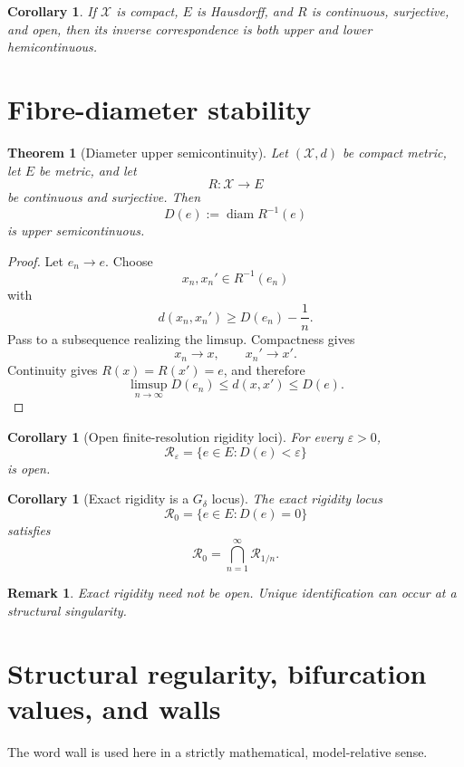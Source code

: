 \documentclass[11pt]{article}
\newtheorem{theorem}[definition]{Theorem}
\newtheorem{corollary}[definition]{Corollary}
\newtheorem{remark}[definition]{Remark}
\newcommand{\X}{\mathcal X}
\begin{document}
\begin{corollary}
If \(\X\) is compact, \(E\) is Hausdorff, and \(R\) is continuous, surjective,
and open, then its inverse correspondence is both upper and lower
hemicontinuous.
\end{corollary}

\section{Fibre-diameter stability}

\begin{theorem}[Diameter upper semicontinuity]
\label{thm:diam-usc}
Let \((\X,d)\) be compact metric, let \(E\) be metric, and let
\[
R:\X\to E
\]
be continuous and surjective. Then
\[
D(e):=\operatorname{diam}R^{-1}(e)
\]
is upper semicontinuous.
\end{theorem}

\begin{proof}
Let \(e_n\to e\). Choose
\[
x_n,x_n'\in R^{-1}(e_n)
\]
with
\[
d(x_n,x_n')
\ge D(e_n)-\frac1n.
\]
Pass to a subsequence realizing the limsup. Compactness gives
\[
x_n\to x,\qquad x_n'\to x'.
\]
Continuity gives \(R(x)=R(x')=e\), and therefore
\[
\limsup_{n\to\infty}D(e_n)
\le d(x,x')
\le D(e).
\]
\end{proof}

\begin{corollary}[Open finite-resolution rigidity loci]
For every \(\varepsilon>0\),
\[
\mathcal R_\varepsilon
=
\{e\in E:D(e)<\varepsilon\}
\]
is open.
\end{corollary}

\begin{corollary}[Exact rigidity is a \(G_\delta\) locus]
The exact rigidity locus
\[
\mathcal R_0
=
\{e\in E:D(e)=0\}
\]
satisfies
\[
\mathcal R_0
=
\bigcap_{n=1}^{\infty}\mathcal R_{1/n}.
\]
\end{corollary}

\begin{remark}
Exact rigidity need not be open. Unique identification can occur at a
structural singularity.
\end{remark}

\section{Structural regularity, bifurcation values, and walls}

The word wall is used here in a strictly mathematical, model-relative sense.
\end{document}
